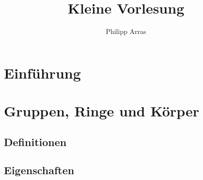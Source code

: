 \documentclass[11pt,a4paper]{article}
\author{Philipp Arras}
\title{Kleine Vorlesung}
\begin{document}
\maketitle
\tableofcontents
\section{Einführung}
\blindtext
\section{Gruppen, Ringe und Körper}
\blindtext
\subsection{Definitionen}
\blindtext
\subsection{Eigenschaften}
\blindtext
\end{document}
